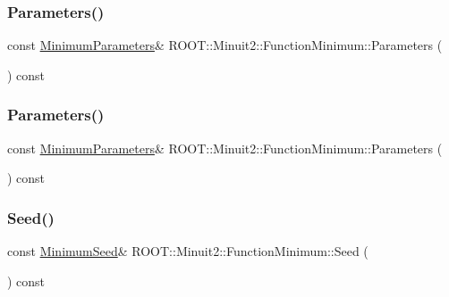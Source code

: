 \subsubsection{\texorpdfstring{Parameters()}{Parameters()}\hspace{0.1cm}{\footnotesize\ttfamily [2/3]}}
{\footnotesize\ttfamily const \mbox{\hyperlink{classROOT_1_1Minuit2_1_1MinimumParameters}{Minimum\+Parameters}}\& R\+O\+O\+T\+::\+Minuit2\+::\+Function\+Minimum\+::\+Parameters (\begin{DoxyParamCaption}{ }\end{DoxyParamCaption}) const\hspace{0.3cm}{\ttfamily [inline]}}

\mbox{\label{classROOT_1_1Minuit2_1_1FunctionMinimum_a069ba097db08f87582b309330ef8aa6e}} 
\subsubsection{\texorpdfstring{Parameters()}{Parameters()}\hspace{0.1cm}{\footnotesize\ttfamily [3/3]}}
{\footnotesize\ttfamily const \mbox{\hyperlink{classROOT_1_1Minuit2_1_1MinimumParameters}{Minimum\+Parameters}}\& R\+O\+O\+T\+::\+Minuit2\+::\+Function\+Minimum\+::\+Parameters (\begin{DoxyParamCaption}{ }\end{DoxyParamCaption}) const\hspace{0.3cm}{\ttfamily [inline]}}

\mbox{\label{classROOT_1_1Minuit2_1_1FunctionMinimum_a9812689b192b202a73ce1178e8098705}} 
\subsubsection{\texorpdfstring{Seed()}{Seed()}\hspace{0.1cm}{\footnotesize\ttfamily [1/3]}}
{\footnotesize\ttfamily const \mbox{\hyperlink{classROOT_1_1Minuit2_1_1MinimumSeed}{Minimum\+Seed}}\& R\+O\+O\+T\+::\+Minuit2\+::\+Function\+Minimum\+::\+Seed (\begin{DoxyParamCaption}{ }\end{DoxyParamCaption}) const\hspace{0.3cm}{\ttfamily [inline]}}

